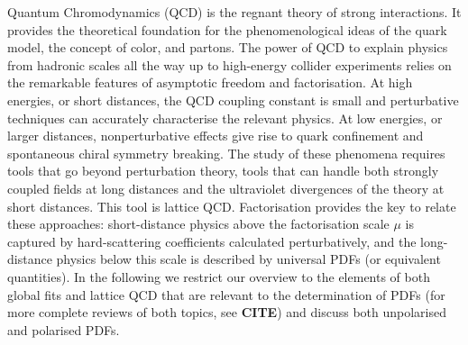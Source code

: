 Quantum Chromodynamics (QCD) is the regnant theory of strong interactions. It provides the 
theoretical foundation 
for the phenomenological ideas of the quark model, the concept of color, and partons. 
The power of QCD to explain physics from hadronic scales all the way up to high-energy collider
experiments relies on the remarkable features of asymptotic freedom and factorisation.
At high energies, or short distances, the QCD coupling constant is small and perturbative
techniques can accurately characterise the relevant physics. At low energies, or larger
distances, nonperturbative effects give rise to quark confinement and spontaneous chiral symmetry breaking. 
The study of these phenomena requires tools that go beyond perturbation theory, tools that can handle both strongly
coupled fields at long distances and the ultraviolet divergences of
the theory at short distances. This tool is lattice QCD. Factorisation provides the key to relate these
approaches: short-distance physics above the factorisation scale $\mu$ is captured by hard-scattering
coefficients calculated perturbatively, and the long-distance physics below this scale is described
by universal PDFs (or equivalent quantities). In the following we restrict our overview to the
elements of both global fits and lattice QCD that are relevant to the determination of PDFs (for more complete
reviews of both topics, see \textbf{CITE\cite{???}}) and discuss both unpolarised and polarised PDFs. 


